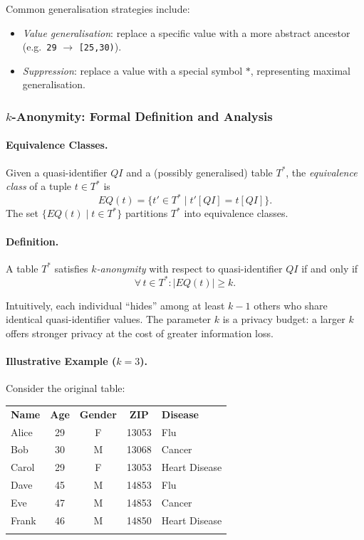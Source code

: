 Common generalisation strategies include:
\begin{itemize}
  \item \textit{Value generalisation}: replace a specific value with a more abstract ancestor (e.g.\ \texttt{29} $\to$ \texttt{[25,30)}).
  \item \textit{Suppression}: replace a value with a special symbol $\ast$, representing maximal generalisation.
\end{itemize}

\subsubsection{$k$-Anonymity: Formal Definition and Analysis}
\label{sec:kanon_formal}

\paragraph{Equivalence Classes.}
Given a quasi-identifier $QI$ and a (possibly generalised) table $T^*$, the \emph{equivalence class} of a tuple $t \in T^*$ is
\[
  EQ(t) = \{t' \in T^* \mid t'[QI] = t[QI]\}.
\]
The set $\{EQ(t) \mid t \in T^*\}$ partitions $T^*$ into equivalence classes.

\paragraph{Definition.}
A table $T^*$ satisfies \emph{$k$-anonymity} with respect to quasi-identifier $QI$ if and only if
\[
  \forall\, t \in T^* : |EQ(t)| \geq k.
\]

Intuitively, each individual ``hides'' among at least $k-1$ others who share identical quasi-identifier values. The parameter $k$ is a privacy budget: a larger $k$ offers stronger privacy at the cost of greater information loss.

\paragraph{Illustrative Example ($k=3$).}

Consider the original table:

\begin{center}
\begin{tabular}{p{2cm}cccp{3cm}}
\hline\noalign{\smallskip}
\textbf{Name} & \textbf{Age} & \textbf{Gender} & \textbf{ZIP} & \textbf{Disease}\\
\noalign{\smallskip}\svhline\noalign{\smallskip}
Alice   & 29 & F & 13053 & Flu\\
Bob     & 30 & M & 13068 & Cancer\\
Carol   & 29 & F & 13053 & Heart Disease\\
Dave    & 45 & M & 14853 & Flu\\
Eve     & 47 & M & 14853 & Cancer\\
Frank   & 46 & M & 14850 & Heart Disease\\
\noalign{\smallskip}\hline\noalign{\smallskip}
\end{tabular}
\end{center}

